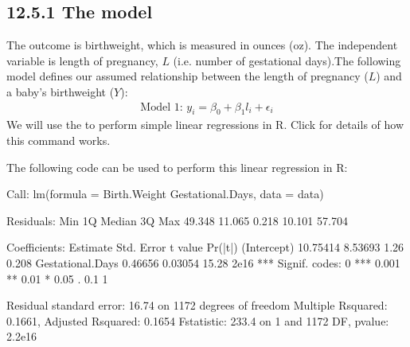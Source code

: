 \documentclass[letterpaper,10pt,english]{jupyterBook}
\begin{document}
\subsection{12.5.1 The model}
\label{\detokenize{12.f. Linear Regression I:the-model}}
\sphinxAtStartPar
The outcome is birthweight, which is measured in ounces (oz). The independent variable is length of pregnancy, \(L\) (i.e. number of gestational days).The following model defines our assumed relationship between the length of pregnancy (\(L\)) and a baby’s birthweight (\(Y\)):
\begin{equation*}
\begin{split}
\text{Model 1: }y_i = \beta_0 + \beta_1 l_i +  \epsilon_i 
\end{split}
\end{equation*}
\sphinxAtStartPar
We will use the  to perform simple linear regressions in R. Click  for details of how this command works.

\sphinxAtStartPar
The following code can be used to perform this linear regression in R:

\begin{sphinxVerbatim}[commandchars=\\\{\}]
 
 
\end{sphinxVerbatim}

\begin{sphinxVerbatim}[commandchars=\\\{\}]
Call:
lm(formula = Birth.Weight \PYGZti{} Gestational.Days, data = data)

Residuals:
    Min      1Q  Median      3Q     Max 
\PYGZhy{}49.348 \PYGZhy{}11.065   0.218  10.101  57.704 

Coefficients:
                  Estimate Std. Error t value Pr(\PYGZgt{}|t|)    
(Intercept)      \PYGZhy{}10.75414    8.53693   \PYGZhy{}1.26    0.208    
Gestational.Days   0.46656    0.03054   15.28   \PYGZlt{}2e\PYGZhy{}16 ***
\PYGZhy{}\PYGZhy{}\PYGZhy{}
Signif. codes:  0 \PYGZsq{}***\PYGZsq{} 0.001 \PYGZsq{}**\PYGZsq{} 0.01 \PYGZsq{}*\PYGZsq{} 0.05 \PYGZsq{}.\PYGZsq{} 0.1 \PYGZsq{} \PYGZsq{} 1

Residual standard error: 16.74 on 1172 degrees of freedom
Multiple R\PYGZhy{}squared:  0.1661,	Adjusted R\PYGZhy{}squared:  0.1654 
F\PYGZhy{}statistic: 233.4 on 1 and 1172 DF,  p\PYGZhy{}value: \PYGZlt{} 2.2e\PYGZhy{}16
\end{sphinxVerbatim}
\end{document}

